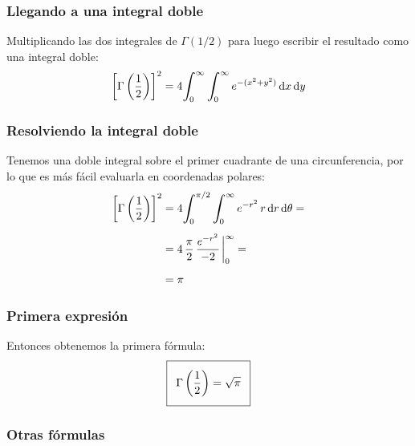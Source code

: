 \documentclass[12pt]{beamer}
\begin{document}
\begin{frame}
\frametitle{Llegando a una integral doble}
Multiplicando las dos integrales de $\Gamma (1/2)$ para luego escribir el resultado como una integral doble:
\pause
\begin{align*}
\left[ \Gamma \left( \dfrac{1}{2} \right) \right]^{2} = 4 \scaleint{6ex}_{\bs 0}^{\infty} \, \scaleint{6ex}_{\bs 0}^{\infty} \, e^{-(x^{2} + y^{2})} \dd{x} \dd{y}
\end{align*}
\end{frame}
\begin{frame}
\frametitle{Resolviendo la integral doble}
Tenemos una doble integral sobre el primer cuadrante de una circunferencia, por lo que es más fácil evaluarla en coordenadas polares:
\pause
\begin{align*}
\left[ \Gamma \left( \dfrac{1}{2} \right) \right]^{2} &= 4 \scaleint{6ex}_{\bs 0}^{\pi/2} \, \scaleint{6ex}_{\bs 0}^{\infty} \, e^{-r^{2}} \, r \dd{r} \dd{\theta} = \\[0.5em]
&= 4 \, \dfrac{\pi}{2} \, \dfrac{e^{-r^{2}}}{-2}\eval_{0}^{\infty} = \\[0.5em]
&= \pi
\end{align*}
\end{frame}
\begin{frame}
\frametitle{Primera expresión}
Entonces obtenemos la primera fórmula:
\pause
\begin{align}\addtolength{\fboxsep}{5pt}\boxed{
\Gamma \left( \dfrac{1}{2} \right) = \sqrt{\pi}}
\label{eq:ecuacion_05_03}
\end{align}
\end{frame}

\subsubsection*{Otras fórmulas}
\end{document}
